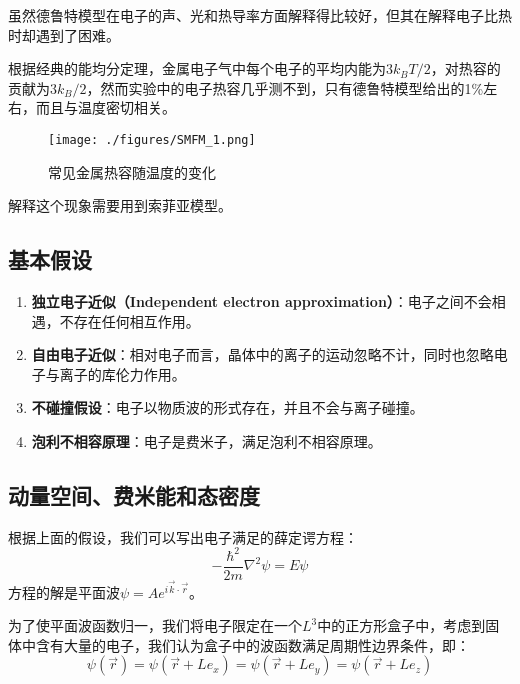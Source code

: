 
虽然德鲁特模型在电子的声、光和热导率方面解释得比较好，但其在解释电子比热时却遇到了困难。

根据经典的能均分定理，金属电子气中每个电子的平均内能为$3k_BT/2$，对热容的贡献为$3k_B/2$，然而实验中的电子热容几乎测不到，只有德鲁特模型给出的1\%左右，而且与温度密切相关。
\begin{figure}[ht]
\centering
\texttt{[image: ./figures/SMFM\_1.png]}
\caption{常见金属热容随温度的变化} \label{SMFM_fig1}
\end{figure}
解释这个现象需要用到索菲亚模型。
\subsection{基本假设}
\begin{enumerate}
\item \textbf{独立电子近似（Independent electron approximation）}：电子之间不会相遇，不存在任何相互作用。
\item \textbf{自由电子近似}：相对电子而言，晶体中的离子的运动忽略不计，同时也忽略电子与离子的库伦力作用。
\item \textbf{不碰撞假设}：电子以物质波的形式存在，并且不会与离子碰撞。
\item \textbf{泡利不相容原理}：电子是费米子，满足泡利不相容原理。
\end{enumerate}
\subsection{动量空间、费米能和态密度}
根据上面的假设，我们可以写出电子满足的薛定谔方程：
\begin{equation}
-\frac{\hbar^2}{2m}\nabla^2\psi=E\psi
\end{equation}
方程的解是平面波$\psi=Ae^{i\vec{k}\cdot \vec{r}}$。

为了使平面波函数归一，我们将电子限定在一个$L^3$中的正方形盒子中，考虑到固体中含有大量的电子，我们认为盒子中的波函数满足周期性边界条件，即：
\begin{equation}
\psi(\vec{r})=\psi(\vec{r}+Le_x)=\psi(\vec{r}+Le_y)=\psi(\vec{r}+Le_z)
\end{equation}
